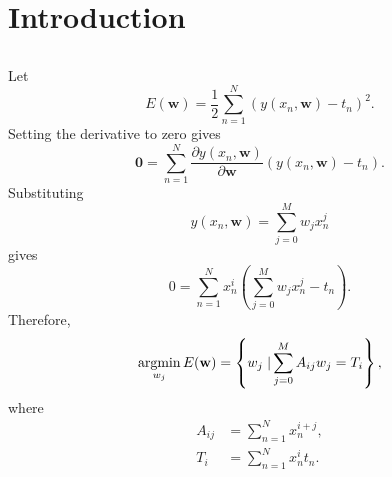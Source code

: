 \section{Introduction}


\subsection{}
\label{1.1}
Let 
%
\begin{equation}
E(\mathbf{w}) 
= 
\frac{1}{2} 
\sum_{n = 1}^{N} 
\left( 
	y(x_n, 
	\mathbf{w}) 
	- 
	t_n 
\right) ^ 2.
\end{equation}
%
Setting the derivative to zero gives
%
\begin{equation}
\mathbf{0} 
= 
\sum_{n = 1}^{N} 
\frac{\partial y(x_n, \mathbf{w})}{\partial \mathbf{w}} 
\left( 
	y(x_n, \mathbf{w}) 
	- 
	t_n 
\right).
\end{equation}
%
Substituting 
%
\begin{equation}
y(x_n, \mathbf{w}) 
= 
\sum_{j = 0}^{M} 
w_j 
x_n ^ j
\end{equation}
%
gives
%
\begin{equation}
0 
= 
\sum_{n = 1}^{N} 
x_n ^ i 
\left( 
	\sum_{j = 0}^{M} 
	w_j 
	x_n ^ j 
	- 
	t_n 
\right).
\end{equation}
%
Therefore,
%
\begin{equation}
\operatorname*{arg min}_{w_j}
E(\mathbf{w})
=
\left \{
	w_j
	\left.
	\right \vert
	\sum_{j = 0}^{M} 
	A_{ij} 
	w_j 
	= 
	T_i	
\right \},
\end{equation}
%
where
%
\begin{equation}
\begin{aligned}
A_{ij} 
&= 
\sum_{n = 1}^{N} 
x_n^{i + j}, \\
T_i 
&= 
\sum_{n = 1}^{N} 
x_n ^i 
t_n.
\end{aligned}
\end{equation}



